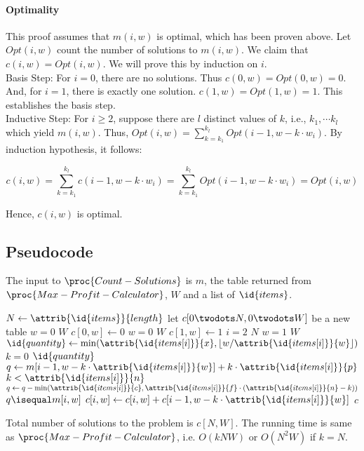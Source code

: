 \documentclass{article}
\newcommand{\floor}[1]{\left\lfloor #1 \right\rfloor}
\newcommand{\itemattr}[1]{\attrib{\id{items[i]}}{#1}}
\begin{document}
\paragraph{Optimality}
This proof assumes that $m(i, w)$ is optimal, which has been proven above. Let $Opt(i, w)$ count the number of solutions to $m(i, w)$. We claim that $c(i, w) = Opt(i, w)$. We will prove this by induction on $i$.\\
Basis Step: For $i = 0$, there are no solutions. Thus $c(0, w) = Opt(0, w) = 0$. And, for $i = 1$, there is exactly one solution. $c(1, w) = Opt(1, w) = 1$. This establishes the basis step.\\
Inductive Step: For $i \geq 2$, suppose there are $l$ distinct values of $k$, i.e., $k_1, \cdots k_l$ which yield $m(i, w)$. Thus, $Opt(i, w) = \sum_{k=k_1}^{k_l} Opt(i-1, w-k \cdot w_i)$. By induction hypothesis, it follows:

$$c(i, w) = \sum_{k=k_1}^{k_l} c(i-1, w-k \cdot w_i)
= \sum_{k=k_1}^{k_l} Opt(i-1, w-k \cdot w_i)
= Opt(i, w)$$

Hence, $c(i, w)$ is optimal.

\subsection{Pseudocode}
The input to $\proc{Count-Solutions}$ is $m$, the table returned from $\proc{Max-Profit-Calculator}$, $W$ and a list of $\id{items}$.

\begin{codebox}
\li $N \gets \attrib{\id{items}}{length}$
\li let $c[0 \twodots N, 0 \twodots W]$ be a new table
\li \For $w = 0$ \To $W$ \Do
\li 	$c[0, w] \gets 0$
	\End
\li \For $w = 0$ \To $W$ \Do
\li 	$c[1, w] \gets 1$
	\End
\li \For $i = 2$ \To $N$ \Do
\li 	\For $w = 1$ \To $W$ \Do
\li 		$\id{quantity} \gets \min(\itemattr{x}, \floor{w/\itemattr{w}})$
\li			\For $k = 0$ \To $\id{quantity}$ \Do
\li 			$q \gets m[i-1, w-k \cdot \itemattr{w}] + k \cdot \itemattr{p}$
\li 			\If $k < \itemattr{n}$ \Then
\li 				$q \gets q - \min(\itemattr{c}, \itemattr{f} \cdot (\itemattr{n} - k))$
				\End
\li 			\If $q \isequal m[i, w]$ \Then
\li 				$c[i, w] \gets c[i, w] + c[i-1, w-k \cdot \itemattr{w}]$
			\End
		\End		
	\End
\End
\li \Return $c$
\end{codebox}

Total number of solutions to the problem is $c[N, W]$. The running time is same as $\proc{Max-Profit-Calculator}$, i.e. $O(kNW)$ or $O(N^2W)$ if $k = N$.
\end{document}
